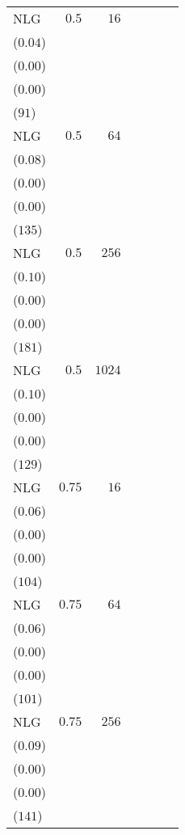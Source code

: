 \begin{table*}[t]
\begin{tabular}{lrrrrrr}
NLG & \(0.5\) & \(16\) & \longcell{\(0.13\)\\{\tiny(\(0.04\))}} & \longcell{\(0.00\)\\{\tiny(\(0.00\))}} & \longcell{\(0.85\)\\{\tiny(\(0.00\))}} & \longcell{\(6142\)\\{\tiny(\(91\))}} \\[2.2ex]
NLG & \(0.5\) & \(64\) & \longcell{\(0.22\)\\{\tiny(\(0.08\))}} & \longcell{\(0.00\)\\{\tiny(\(0.00\))}} & \longcell{\(0.85\)\\{\tiny(\(0.00\))}} & \longcell{\(6011\)\\{\tiny(\(135\))}} \\[2.2ex]
NLG & \(0.5\) & \(256\) & \longcell{\(0.38\)\\{\tiny(\(0.10\))}} & \longcell{\(0.00\)\\{\tiny(\(0.00\))}} & \longcell{\(0.85\)\\{\tiny(\(0.00\))}} & \longcell{\(5859\)\\{\tiny(\(181\))}} \\[2.2ex]
NLG & \(0.5\) & \(1024\) & \longcell{\(0.60\)\\{\tiny(\(0.10\))}} & \longcell{\(0.00\)\\{\tiny(\(0.00\))}} & \longcell{\(0.85\)\\{\tiny(\(0.00\))}} & \longcell{\(5659\)\\{\tiny(\(129\))}} \\[2.2ex]
NLG & \(0.75\) & \(16\) & \longcell{\(0.11\)\\{\tiny(\(0.06\))}} & \longcell{\(0.00\)\\{\tiny(\(0.00\))}} & \longcell{\(0.85\)\\{\tiny(\(0.00\))}} & \longcell{\(6164\)\\{\tiny(\(104\))}} \\[2.2ex]
NLG & \(0.75\) & \(64\) & \longcell{\(0.24\)\\{\tiny(\(0.06\))}} & \longcell{\(0.00\)\\{\tiny(\(0.00\))}} & \longcell{\(0.85\)\\{\tiny(\(0.00\))}} & \longcell{\(5957\)\\{\tiny(\(101\))}} \\[2.2ex]
NLG & \(0.75\) & \(256\) & \longcell{\(0.37\)\\{\tiny(\(0.09\))}} & \longcell{\(0.00\)\\{\tiny(\(0.00\))}} & \longcell{\(0.85\)\\{\tiny(\(0.00\))}} & \longcell{\(5816\)\\{\tiny(\(141\))}} \\[2.2ex]

\end{tabular}
\end{table*}
